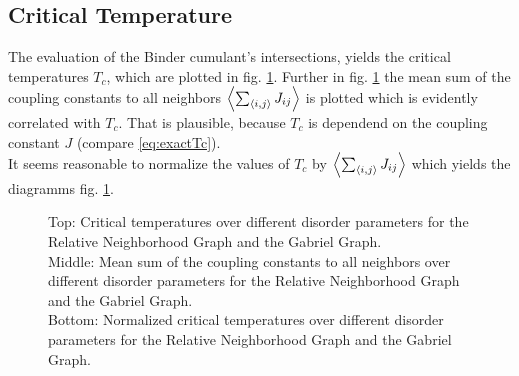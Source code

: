 \subsection{Critical Temperature}
\label{ssec:binderIntersections}
    The evaluation of the Binder cumulant's intersections, yields the
    critical temperatures \(T_c\), which are plotted in
    fig. \ref{fig:Tc}.
    Further in fig. \ref{fig:Tc}
    the mean sum of the coupling constants to all neighbors \(\left< \sum_{\left< i,j \right>} J_{ij} \right>\)
    is plotted which is evidently correlated with \(T_c\).
    That is plausible, because \(T_c\) is dependend on the coupling
    constant \(J\) (compare \eqref{eq:exactTc}).\\
    It seems reasonable to normalize the values of \(T_{c}\) by
    \(\left< \sum_{\left< i,j \right>} J_{ij} \right>\) which yields the diagramms fig.
    \ref{fig:Tc}.
    \begin{figure}[htbp]
        \centering


        \caption[Critical Temperature over different disorder parameters]
        {
            Top: Critical temperatures over different
            disorder parameters for
             the Relative Neighborhood Graph and
             the Gabriel Graph.\\
            Middle: Mean sum of the coupling constants to all
            neighbors over different disorder parameters for
             the Relative Neighborhood Graph and
             the Gabriel Graph.\\
            Bottom: Normalized critical temperatures over different
            disorder parameters for
             the Relative Neighborhood Graph and
             the Gabriel Graph.
        }
        \label{fig:Tc}
    \end{figure}\\
